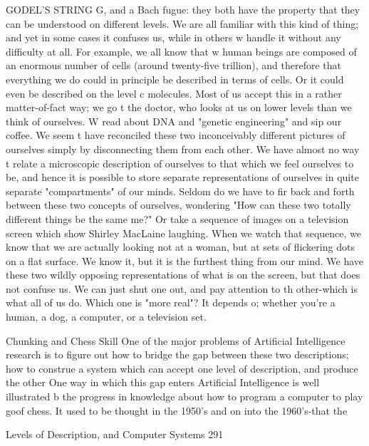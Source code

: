 GODEL'S STRING G, and a Bach fugue: they both have the property that they can be
understood on different levels. We are all familiar with this kind of thing; and yet in some
cases it confuses us, while in others w handle it without any difficulty at all. For example,
we all know that w human beings are composed of an enormous number of cells (around
twenty-five trillion), and therefore that everything we do could in principle be described
in terms of cells. Or it could even be described on the level c molecules. Most of us
accept this in a rather matter-of-fact way; we go t the doctor, who looks at us on lower
levels than we think of ourselves. W read about DNA and "genetic engineering" and sip
our coffee. We seem t have reconciled these two inconceivably different pictures of
ourselves simply by disconnecting them from each other. We have almost no way t relate
a microscopic description of ourselves to that which we feel ourselves to be, and hence it
is possible to store separate representations of ourselves in quite separate "compartments"
of our minds. Seldom do we have to fir back and forth between these two concepts of
ourselves, wondering "How can these two totally different things be the same me?"
        Or take a sequence of images on a television screen which show Shirley
MacLaine laughing. When we watch that sequence, we know that we are actually looking
not at a woman, but at sets of flickering dots on a flat surface. We know it, but it is the
furthest thing from our mind. We have these two wildly opposing representations of what
is on the screen, but that does not confuse us. We can just shut one out, and pay attention
to th other-which is what all of us do. Which one is "more real"? It depends o; whether
you're a human, a dog, a computer, or a television set.

                             Chunking and Chess Skill
One of the major problems of Artificial Intelligence research is to figure out how to
bridge the gap between these two descriptions; how to construe a system which can
accept one level of description, and produce the other One way in which this gap enters
Artificial Intelligence is well illustrated b the progress in knowledge about how to
program a computer to play goof chess. It used to be thought in the 1950's and on into the
1960's-that the




Levels of Description, and Computer Systems                                              291


